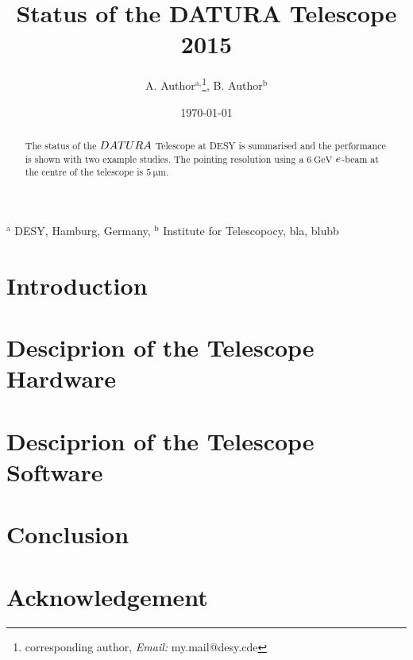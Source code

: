 \documentclass[a4paper,10pt]{scrartcl}
\newcommand{\e}{\ensuremath{\mathnormal{e}}}
\newcommand{\Datura}{\ensuremath{\mathnormal{DATURA}}}
\begin{document}
 \setpagewiselinenumbers
\modulolinenumbers[5]
\linenumbers


\title{Status of the DATURA Telescope 2015}
\author{A. Author${}^{\textrm{a},}$\thanks{corresponding author, \textit{Email:} my.mail@desy.cde}, B. Author${}^{\textrm{b}}$}
\date{\today}
\maketitle


\hspace{0.85cm}${}^{\textrm{a}}$ DESY, Hamburg, Germany, ${}^{\textrm{b}}$ Institute for Telescopocy, bla, blubb


\normalsize

\begin{abstract}
\noindent 
The status of the $\Datura$ Telescope at DESY is summarised and the performance is shown with two example studies. 
The pointing resolution using a $\SI{6}{\GeV}$ $\e$-beam at the centre of the telescope is $\SI{5}{\micro\m}$.

\end{abstract}


\section{Introduction}


\section{Desciprion of the Telescope Hardware}
%

\section{Desciprion of the Telescope Software}
%

\section{Conclusion}

\section*{Acknowledgement}

\small


\end{document}
